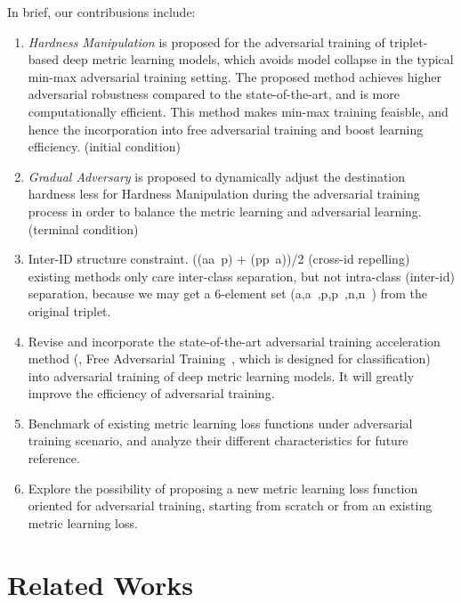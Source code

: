 \documentclass[10pt,twocolumn,letterpaper]{article}
\begin{document}
In brief, our contribusions include:
%
\begin{enumerate}[noitemsep]
	\item {\textit{Hardness Manipulation}} is proposed for the adversarial
		training of triplet-based deep metric learning models, which avoids
		model collapse in the typical min-max adversarial training setting.
		The proposed method achieves higher adversarial robustness compared to
		the state-of-the-art, and is more computationally efficient.
		This method makes min-max training feaisble, and hence the incorporation
		into free adversarial training and boost learning efficiency.
		(initial condition)
	\item \textit{Gradual Adversary} is proposed to dynamically adjust the
		destination hardness less for Hardness Manipulation during the
		adversarial training process in order to balance the metric learning
		and adversarial learning.
		(terminal condition)
	\item Inter-ID structure constraint. ((aa~p) + (pp~a))/2
		(cross-id repelling)
		existing methods only care inter-class separation, but not
		intra-class (inter-id) separation, because we may get a 6-element
		set (a,a~,p,p~,n,n~) from the original triplet.
	\item Revise and incorporate the state-of-the-art adversarial training
		acceleration method (\ie, Free Adversarial Training~\cite{freeat},
		which is designed for classification) into adversarial training of 
		deep metric learning models. It will greatly improve the efficiency
		of adversarial training.
	\item Benchmark of existing metric learning loss functions under
		adversarial training scenario, and analyze their different
		characteristics for future reference.
	\item Explore the possibility of proposing a new metric learning loss
		function oriented for adversarial training, starting from scratch or
		from an existing metric learning loss.
\end{enumerate}

\section{Related Works}
\label{sec:2}
\end{document}

